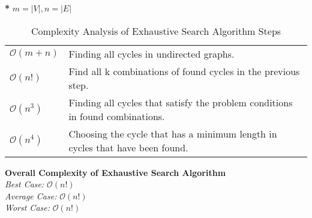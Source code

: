 \documentclass{beamer}
\begin{document}
\begin{chart5}
    \begin{table}[!htbp]
    \begin{flushleft}
    \textbf{*} $m = |V|, n = |E|$
    \vspace*{0.15cm}
    \end{flushleft}
    \centering
    \begin{tabular}{| m{3cm} | m{7cm} |} 
        \hline
        \textbf{\centerline{Complexity}} & \textbf{\centerline{Algorithm Step}} \\
        \hline
        \hspace*{\fill} $\mathcal{O}(m + n)$ \hspace*{\fill} & Finding all cycles in undirected graphs.\cite{book8} \\ 
        \hline
        \hspace*{\fill} $\mathcal{O}(n!)$ \hspace*{\fill} & Find all k combinations of found cycles in the previous step. \cite{eleven}\\ 
        \hline
        \hspace*{\fill} $\mathcal{O}(n^3)$ \hspace*{\fill} & Finding all cycles that satisfy the problem conditions in found combinations.\\
        \hline
        \hspace*{\fill} $\mathcal{O}(n^4)$ \hspace*{\fill} & Choosing the cycle that has a minimum length in cycles that have been found.\\ 
        \hline
    \end{tabular}
    \caption{\label{tab:widgets3}Complexity Analysis of Exhaustive
Search Algorithm Steps}
    \textbf{Overall Complexity of Exhaustive Search Algorithm} \\
    \vspace{0.02\textheight}
\textit{Best Case:} $\mathcal{O}(n!)$ \\
\textit{Average Case:} $\mathcal{O}(n!)$ \\
\textit{Worst Case:} $\mathcal{O}(n!)$ 
\end{table}

			    
\end{chart5}
\end{document}
